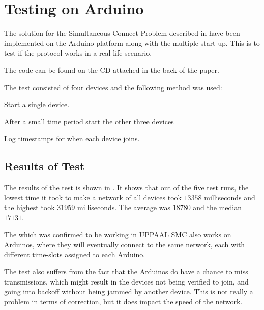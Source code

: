 \section{Testing on Arduino}\label{sec:ccrc_test}
The solution for the Simultaneous Connect Problem described in  have been implemented on the Arduino platform along with the multiple start-up.
This is to test if the protocol works in a real life scenario. 

The code can be found on the CD attached in the back of the paper.

The test consisted of four devices and the following method was used:
\begin{eletterate}
	\item Start a single device.
	\item After a small time period start the other three devices
	\item Log timestamps for when each device joins.
\end{eletterate}

\subsection{Results of Test}
The results of the test is shown in .
It shows that out of the five test runs, the lowest time it took to make a network of all devices took $13 358$ milliseconds and the highest took $31 959$ milliseconds.
The average was $18780$ and the median $17131$.

The  which was confirmed to be working in UPPAAL SMC also works on Arduinos, where they will eventually connect to the same network, each with different time-slots assigned to each Arduino.

The test also suffers from the fact that the Arduinos do have a chance to miss transmissions, which might result in the devices not being verified to join, and going into backoff without being jammed by another device.
This is not really a problem in terms of correction, but it does impact the speed of the network.

